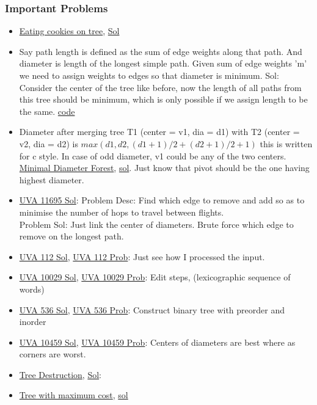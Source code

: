 \documentclass[8pt, a4paper, oneside, twocolumn]{extarticle}
\begin{document}
\subsubsection{Important Problems}
\begin{itemize}
    \item \href{https://codeforces.com/contest/1099/problem/F}{Eating cookies on tree}, \href{https://codeforces.com/blog/entry/64296?#comment-482494}{Sol}
    \item Say path length is defined as the sum of edge weights along that path. And diameter is length of the longest simple path. Given sum of edge weights 'm' we need to assign weights to edges so that diameter is minimum. Sol: Consider the center of the tree like before, now the length of all paths from this tree should be minimum, which is only possible if we assign length to be the same. \href{https://codeforces.com/contest/1086/submission/47400574}{code}
    \item Diameter after merging tree T1 (center = v1, dia = d1) with T2 (center = v2, dia = d2) is $max (d1, d2, (d1 + 1)/2 + (d2 + 1)/2 + 1)$ this is written for c style. In case of odd diameter, v1 could be any of the two centers. \href{https://codeforces.com/contest/1092/problem/E}{Minimal Diameter Forest}, \href{https://gist.github.com/sourabh2311/39abbe4cf84fcfce62051f1ae0fe4638}{sol}. Just know that pivot should be the one having highest diameter.
	\item \href {https://gist.github.com/sourabh2311/6cff69fef833097556696bd6f31f3f1d}{UVA 11695 Sol}: Problem Desc: Find which edge to remove and add so as to minimise the number of hops to travel between flights.\\
	Problem Sol: Just link the center of diameters. Brute force which edge to remove on the longest path. 
	\item \href {https://github.com/sourabh2311/Competitive-Programming/blob/master/UVA_112.cpp}{UVA 112 Sol}, \href {https://uva.onlinejudge.org/external/1/112.pdf}{UVA 112 Prob}: Just see how I processed the input.	
	\item \href {https://gist.github.com/sourabh2311/6b761c14bef4e5887e6b03b809bc4983}{UVA 10029 Sol}, \href {https://uva.onlinejudge.org/external/100/10029.pdf}{UVA 10029 Prob}: Edit steps, (lexicographic sequence of words)	
	\item \href {https://gist.github.com/sourabh2311/d73572fab5cf6d390f509d29abf4cd60}{UVA 536 Sol}, \href {https://uva.onlinejudge.org/external/5/536.pdf}{UVA 536 Prob}: Construct binary tree with preorder and inorder	
	\item \href {https://gist.github.com/sourabh2311/25edb7a7067948832ade9192bd2635ce}{UVA 10459 Sol}, \href {https://uva.onlinejudge.org/external/104/10459.pdf}{UVA 10459 Prob}: Centers of diameters are best where as corners are worst.	
    \item \href{https://codeforces.com/contest/911/problem/F}{Tree Destruction}, \href{https://codeforces.com/contest/911/submission/34122817}{Sol}:
    \item \href{https://codeforces.com/contest/1092/problem/F}{Tree with maximum cost}, \href{https://github.com/sourabh2311/Competitive-Programming/blob/master/CF/527%20Div3/F.cpp}{sol}
\end{itemize}
\end{document}
